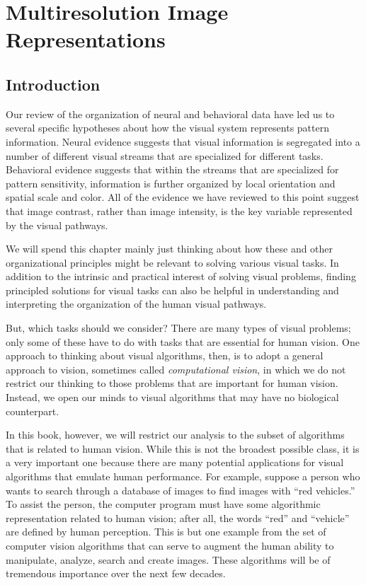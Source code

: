 \chapter{Multiresolution Image Representations}
\label{chapter:multiresolution}
\section{Introduction}

Our review of the organization of neural and behavioral data have led
us to several specific hypotheses about how the visual system
represents pattern information.  Neural evidence suggests that visual
information is segregated into a number of different visual streams
that are specialized for different tasks.  Behavioral evidence
suggests that within the streams that are specialized for pattern
sensitivity, information is further organized by local orientation and
spatial scale and color.  All of the evidence we have reviewed
to this point suggest that image contrast, rather than image
intensity, is the key variable represented by the visual pathways.

We will spend this chapter mainly just thinking about how these and
other organizational principles might be relevant to solving various
visual tasks.  In addition to the intrinsic and practical interest of
solving visual problems, finding principled solutions for visual tasks
can also be helpful in understanding and interpreting the organization
of the human visual pathways.

But, which tasks should we consider?  There are many types of visual
problems; only some of these have to do with tasks that are essential
for human vision.  One approach to thinking about visual algorithms,
then, is to adopt a general approach to vision, sometimes called {\em
computational vision}, in which we do not restrict our thinking to
those problems that are important for human vision.  Instead, we open
our minds to visual algorithms that may have no biological
counterpart.

In this book, however, we will restrict our analysis to the subset of
algorithms that is related to human vision.  While this is not the
broadest possible class, it is a very important one because there are
many potential applications for visual algorithms that emulate human
performance.  For example, suppose a person who wants to search
through a database of images to find images with ``red vehicles.''  To
assist the person, the computer program must have some algorithmic
representation related to human vision; after all, the words ``red''
and ``vehicle'' are defined by human perception.  This is but one
example from the set of computer vision algorithms that can serve to
augment the human ability to manipulate, analyze, search and create
images.  These algorithms will be of tremendous importance over the
next few decades.

